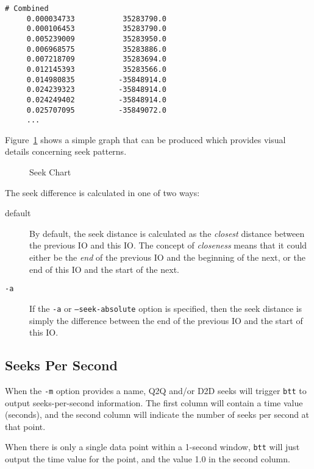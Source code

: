 \documentclass{article}
\begin{document}
\begin{verbatim}
# Combined
     0.000034733           35283790.0
     0.000106453           35283790.0
     0.005239009           35283950.0
     0.006968575           35283886.0
     0.007218709           35283694.0
     0.012145393           35283566.0
     0.014980835          -35848914.0
     0.024239323          -35848914.0
     0.024249402          -35848914.0
     0.025707095          -35849072.0
     ...
\end{verbatim}

  Figure~\ref{fig:seek} shows a simple graph that can be produced which
  provides visual details concerning seek patterns.

  \begin{figure}[h!]
  \leavevmode\centering
  \caption{\label{fig:seek}Seek Chart}
  \end{figure}
  \FloatBarrier

  The seek difference is calculated in one of two ways:

  \begin{description}
    \item[default] By default, the seek distance is calculated as the
    \emph{closest} distance between the previous IO and this IO. The
    concept of \emph{closeness} means that it could either be the
    \emph{end} of the previous IO and the beginning of the next, or the
    end of this IO and the start of the next.

    \item[\texttt{-a}] If the \texttt{-a} or \texttt{--seek-absolute}
    option is specified, then the seek distance is simply the difference
    between the end of the previous IO and the start of this IO.
  \end{description}

\newpage\subsection{\label{sec:sps-spec}Seeks Per Second}

  When the \texttt{-m} option provides a name, Q2Q and/or D2D seeks
  will trigger \texttt{btt} to output seeks-per-second information. The
  first column will contain a time value (seconds), and the second column
  will indicate the number of seeks per second at that point.

  When there is only a single data point within a 1-second window,
  \texttt{btt} will just output the time value for the point, and the
  value 1.0 in the second column.
\end{document}
